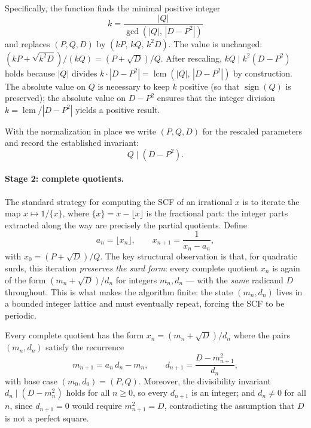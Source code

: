 Specifically, the function finds the minimal positive integer
\[
  k = \frac{|Q|}{\gcd(|Q|,\,|D - P^2|)}
\]
and replaces $(P, Q, D)$ by $(kP,\, kQ,\, k^2 D)$.  The value is unchanged:
$(kP + \sqrt{k^2 D})/(kQ) = (P + \sqrt{D})/Q$.  After rescaling,
$kQ \mid k^2(D - P^2)$ holds because $|Q|$ divides
$k \cdot |D - P^2| = \operatorname{lcm}(|Q|,\,|D - P^2|)$ by construction.
The absolute value on $Q$ is necessary to keep $k$ positive (so that
$\operatorname{sign}(Q)$ is preserved); the absolute value on $D - P^2$
ensures that the integer division $k = \operatorname{lcm}/|D - P^2|$ yields
a positive result.

With the normalization in place we write $(P, Q, D)$ for the rescaled parameters
and record the established invariant:
\[
  Q \mid (D - P^2). \tag{N}
\]

\paragraph{Stage 2: complete quotients.}
The standard strategy for computing the SCF of an irrational $x$ is to iterate
the map $x \mapsto 1/\{x\}$, where $\{x\} = x - \lfloor x \rfloor$ is the
fractional part: the integer parts extracted along the way are precisely the
partial quotients.  Define
\[
  a_n = \lfloor x_n \rfloor, \qquad x_{n+1} = \frac{1}{x_n - a_n},
\]
with $x_0 = (P + \sqrt{D})/Q$.  The key structural observation is that, for
quadratic surds, this iteration \emph{preserves the surd form}: every
complete quotient $x_n$ is again of the form $(m_n + \sqrt{D})/d_n$ for integers
$m_n, d_n$ — with the \emph{same} radicand $D$ throughout.  This is what makes
the algorithm finite: the state $(m_n, d_n)$ lives in a bounded integer lattice
and must eventually repeat, forcing the SCF to be periodic.

\begin{lemma}
  \label{lem:cq-recurrence}
  Every complete quotient has the form $x_n = (m_n + \sqrt{D})/d_n$ where the
  pairs $(m_n, d_n)$ satisfy the recurrence
  \[
    m_{n+1} = a_n\, d_n - m_n,
    \qquad
    d_{n+1} = \frac{D - m_{n+1}^2}{d_n}, \tag{R}
  \]
  with base case $(m_0, d_0) = (P, Q)$.  Moreover, the divisibility invariant
  $d_n \mid (D - m_n^2)$ holds for all $n \geq 0$, so every $d_{n+1}$ is an
  integer; and $d_n \neq 0$ for all $n$, since $d_{n+1} = 0$ would require
  $m_{n+1}^2 = D$, contradicting the assumption that $D$ is not a perfect
  square.
\end{lemma}

